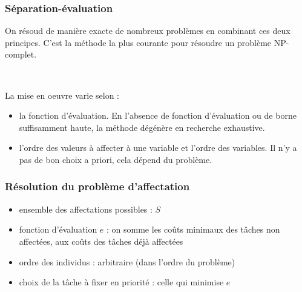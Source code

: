 \documentclass{beamer}
\begin{document}
\begin{frame}
  \frametitle{Séparation-évaluation}

  On résoud de manière exacte de nombreux problèmes en combinant
  ces deux principes. C'est la méthode la plus courante pour
  résoudre un problème NP-complet. 

  ~
  
  La mise en oeuvre varie selon :
  \begin{itemize}
  \item la fonction d'évaluation. En l'absence de fonction d'évaluation
    ou de borne suffisamment haute, la méthode dégénère en recherche exhaustive.
  \item l'ordre des valeurs à affecter à une variable et l'ordre des variables.
    Il n'y a pas de bon choix a priori, cela dépend du problème.  
  \end{itemize}

  
\end{frame}

\begin{frame}
  \frametitle{Résolution du problème d'affectation}

  \begin{itemize}
    \item ensemble des affectations possibles : $S$ 
    \item fonction d'évaluation $e$ : on somme les coûts minimaux des tâches non affectées, aux coûts des tâches déjà affectées
    \item ordre des individus : arbitraire (dans l'ordre du problème) %
    \item choix de la tâche à fixer en priorité : celle qui minimise $e$ %
  \end{itemize}
\end{frame}
\end{document}
